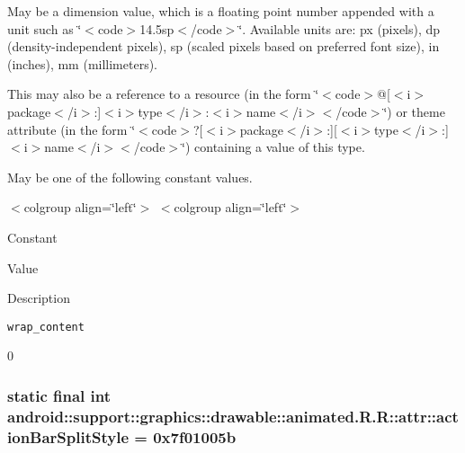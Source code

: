 May be a dimension value, which is a floating point number appended with a unit such as \char`\"{}$<$code$>$14.5sp$<$/code$>$\char`\"{}. Available units are: px (pixels), dp (density-independent pixels), sp (scaled pixels based on preferred font size), in (inches), mm (millimeters). 

This may also be a reference to a resource (in the form \char`\"{}$<$code$>$@\mbox{[}$<$i$>$package$<$/i$>$:\mbox{]}$<$i$>$type$<$/i$>$:$<$i$>$name$<$/i$>$$<$/code$>$\char`\"{}) or theme attribute (in the form \char`\"{}$<$code$>$?\mbox{[}$<$i$>$package$<$/i$>$:\mbox{]}\mbox{[}$<$i$>$type$<$/i$>$:\mbox{]}$<$i$>$name$<$/i$>$$<$/code$>$\char`\"{}) containing a value of this type. 

May be one of the following constant values. \begin{TabularC}{0}
\hline
\end{TabularC}
$<$colgroup align=\char`\"{}left\char`\"{}$>$ $<$colgroup align=\char`\"{}left\char`\"{}$>$ 

Constant

Value

Description 

{\tt wrap\_\-content}

0\hypertarget{classandroid_1_1support_1_1graphics_1_1drawable_1_1animated_1_1_r_1_1attr_ad2b356e5efe4cf219c5d101ee5886fe}{
\subsubsection[{actionBarSplitStyle}]{\setlength{\rightskip}{0pt plus 5cm}static final int android::support::graphics::drawable::animated.R.R::attr::actionBarSplitStyle = 0x7f01005b}}
\label{classandroid_1_1support_1_1graphics_1_1drawable_1_1animated_1_1_r_1_1attr_ad2b356e5efe4cf219c5d101ee5886fe}


